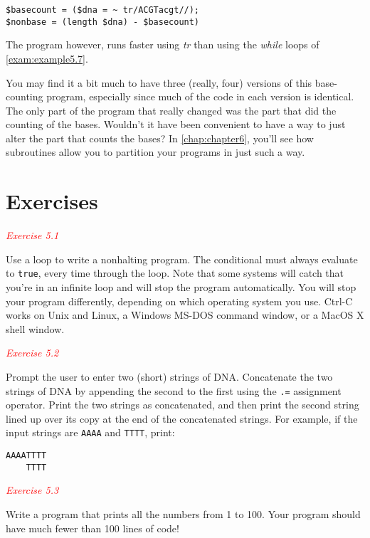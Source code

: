 \begin{lstlisting}
$basecount = ($dna = ~ tr/ACGTacgt//);
$nonbase = (length $dna) - $basecount)
\end{lstlisting}

The program however, runs faster using \textit{tr} than using the \textit{while} loops of \autoref{exam:example5.7}.

You may find it a bit much to have three (really, four) versions of this base-counting program, especially since much of the code in each version is identical. The only part of the program that really changed was the part that did the counting of the bases. Wouldn't it have been convenient to have a way to just alter the part that counts the bases? In \autoref{chap:chapter6}, you'll see how subroutines allow you to partition your programs in just such a way. 

\section{Exercises}
\textcolor{red}{\textit{Exercise 5.1}}
\begin{adjustwidth}{1cm}{}
Use a loop to write a nonhalting program. The conditional must always evaluate to \verb|true|, every time through the loop. Note that some systems will catch that you're in an infinite loop and will stop the program automatically. You will stop your program differently, depending on which operating system you use. Ctrl-C works on Unix and Linux, a Windows MS-DOS command window, or a MacOS X shell window. 
\end{adjustwidth}

\textcolor{red}{\textit{Exercise 5.2}}
\begin{adjustwidth}{1cm}{}
Prompt the user to enter two (short) strings of DNA. Concatenate the two strings of DNA by appending the second to the first using the \verb|.=| assignment operator. Print the two strings as concatenated, and then print the second string lined up over its copy at the end of the concatenated strings. For example, if the input strings are \verb|AAAA| and \verb|TTTT|, print:
\begin{verbatim}
AAAATTTT
    TTTT
\end{verbatim}

\end{adjustwidth}

\textcolor{red}{\textit{Exercise 5.3}}
\begin{adjustwidth}{1cm}{}
Write a program that prints all the numbers from 1 to 100. Your program should have much fewer than 100 lines of code! 
\end{adjustwidth}

